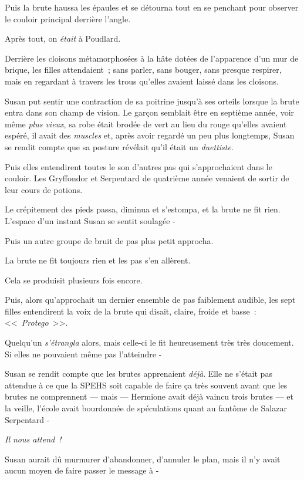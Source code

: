 Puis la brute haussa les épaules et se détourna tout en se penchant pour observer le couloir principal derrière l'angle.

Après tout, on \emph{était} à Poudlard.

Derrière les cloisons métamorphosées à la hâte dotées de l'apparence d'un mur de brique, les filles attendaient~; sans parler, sans bouger, sans presque respirer, mais en regardant à travers les trous qu'elles avaient laissé dans les cloisons.

Susan put sentir une contraction de sa poitrine jusqu'à ses orteils lorsque la brute entra dans son champ de vision. Le garçon semblait être en septième année, voir même \emph{plus vieux}, sa robe était brodée de vert au lieu du rouge qu'elles avaient espéré, il avait des \emph{muscles} et, après avoir regardé un peu plus longtemps, Susan se rendit compte que sa posture révélait qu'il était un \emph{duettiste}.

Puis elles entendirent toutes le son d'autres pas qui s'approchaient dans le couloir. Les Gryffondor et Serpentard de quatrième année venaient de sortir de leur cours de potions.

Le crépitement des pieds passa, diminua et s'estompa, et la brute ne fit rien. L'espace d'un instant Susan se sentit soulagée -

Puis un autre groupe de bruit de pas plus petit approcha.

La brute ne fit toujours rien et les pas s'en allèrent.

Cela se produisit plusieurs fois encore.

Puis, alors qu'approchait un dernier ensemble de pas faiblement audible, les sept filles entendirent la voix de la brute qui disait, claire, froide et basse~: <<~\emph{Protego}~>>.

Quelqu'un \emph{s'étrangla} alors, mais celle-ci le fit heureusement très très doucement. Si elles ne pouvaient même pas l'atteindre -

Susan se rendit compte que les brutes apprenaient \emph{déjà}. Elle ne s'était pas attendue à ce que la SPEHS soit capable de faire ça très souvent avant que les brutes ne comprennent — mais — Hermione avait déjà vaincu trois brutes — et la veille, l'école avait bourdonnée de spéculations quant au fantôme de Salazar Serpentard -

\emph{Il nous attend~!}

Susan aurait dû murmurer d'abandonner, d'annuler le plan, mais il n'y avait aucun moyen de faire passer le message à -

